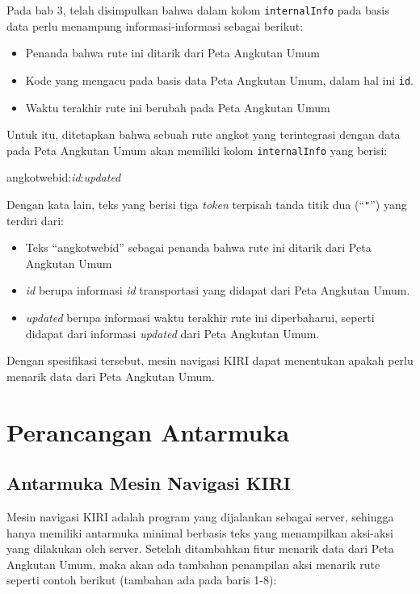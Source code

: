 Pada bab 3, telah disimpulkan bahwa dalam kolom \texttt{internalInfo} pada basis data perlu menampung informasi-informasi sebagai berikut:

\begin{itemize}
	\item Penanda bahwa rute ini ditarik dari Peta Angkutan Umum
	\item Kode yang mengacu pada basis data Peta Angkutan Umum, dalam hal ini \texttt{id}.
	\item Waktu terakhir rute ini berubah pada Peta Angkutan Umum
\end{itemize}

Untuk itu, ditetapkan bahwa sebuah rute angkot yang terintegrasi dengan data pada Peta Angkutan Umum akan memiliki kolom \texttt{internalInfo} yang berisi:

\begin{center}
angkotwebid:\textit{id}:\textit{updated}
\end{center} 

Dengan kata lain, teks yang berisi tiga \textit{token} terpisah tanda titik dua (``\texttt{"}'') yang terdiri dari:

\begin{itemize}
	\item Teks ``angkotwebid'' sebagai penanda bahwa rute ini ditarik dari Peta Angkutan Umum
	\item \textit{id} berupa informasi \textit{id} transportasi yang didapat dari Peta Angkutan Umum.
	\item \textit{updated} berupa informasi waktu terakhir rute ini diperbaharui, seperti didapat dari informasi \textit{updated} dari Peta Angkutan Umum.
\end{itemize}

Dengan spesifikasi tersebut, mesin navigasi KIRI dapat menentukan apakah perlu menarik data dari Peta Angkutan Umum.

\section{Perancangan Antarmuka}

\subsection{Antarmuka Mesin Navigasi KIRI}

Mesin navigasi KIRI adalah program yang dijalankan sebagai server, sehingga hanya memiliki antarmuka minimal berbasis teks yang menampilkan aksi-aksi yang dilakukan oleh server. Setelah ditambahkan fitur menarik data dari Peta Angkutan Umum, maka akan ada tambahan penampilan aksi menarik rute seperti contoh berikut (tambahan ada pada baris 1-8):

